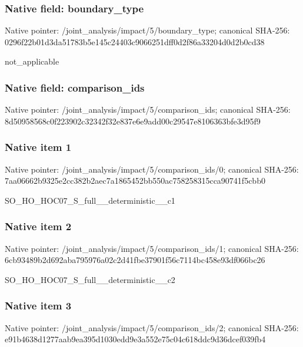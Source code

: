 \documentclass[10pt,a4paper]{article}
\begin{document}
\subsubsection{Native field: boundary\_\allowbreak{}type}
Native pointer: /joint\_\allowbreak{}analysis/impact/5/boundary\_\allowbreak{}type; canonical SHA-256: 0296f22b01d3da51783b5e145c24403c9066251dff0d2f86a33204d0d2b0cd38

\begingroup\raggedright\sloppy not\_\allowbreak{}applicable\par\endgroup

\subsubsection{Native field: comparison\_\allowbreak{}ids}
Native pointer: /joint\_\allowbreak{}analysis/impact/5/comparison\_\allowbreak{}ids; canonical SHA-256: 8d50958568c0f223902c32342f32e837e6e9add00c29547e8106363bfe3d95f9

\subsubsection{Native item 1}
Native pointer: /joint\_\allowbreak{}analysis/impact/5/comparison\_\allowbreak{}ids/0; canonical SHA-256: 7aa06662b9325e2cc382b2aec7a1865452bb550ac758258315cca90741f5cbb0

\begingroup\raggedright\sloppy SO\_\allowbreak{}HO\_\allowbreak{}HOC07\_\allowbreak{}S\_\allowbreak{}full\_\allowbreak{}\_\allowbreak{}deterministic\_\allowbreak{}\_\allowbreak{}c1\par\endgroup

\subsubsection{Native item 2}
Native pointer: /joint\_\allowbreak{}analysis/impact/5/comparison\_\allowbreak{}ids/1; canonical SHA-256: 6cb93489b2d692aba795976a02c2d41fbe37901f56c7114bc458e93df066bc26

\begingroup\raggedright\sloppy SO\_\allowbreak{}HO\_\allowbreak{}HOC07\_\allowbreak{}S\_\allowbreak{}full\_\allowbreak{}\_\allowbreak{}deterministic\_\allowbreak{}\_\allowbreak{}c2\par\endgroup

\subsubsection{Native item 3}
Native pointer: /joint\_\allowbreak{}analysis/impact/5/comparison\_\allowbreak{}ids/2; canonical SHA-256: e91b4638d1277aab9ea395d1030edd9e3a552e75c04c618ddc9d36dcef039fb4
\end{document}
